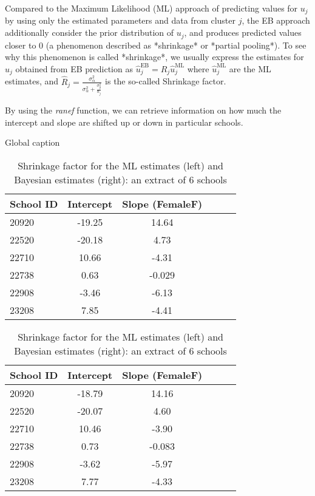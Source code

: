 Compared to the Maximum Likelihood (ML) approach of predicting values for $u_j$ by using only the estimated parameters and data from cluster $j$, the EB approach additionally consider the prior distribution of $u_{j}$, and produces predicted values closer to $0$ (a phenomenon described as *shrinkage* or *partial pooling*).  To see why this phenomenon is called *shrinkage*, we usually express the estimates for $u_j$ obtained from EB prediction as $\hat{u}_j^{\text{EB}} = \hat{R}_j\hat{u}_j^{\text{ML}}$ where $\hat{u}_j^{\text{ML}}$ are the ML estimates, and $\hat{R}_j = \frac{\sigma_\alpha^2}{\sigma_\alpha^2 + \frac{\sigma_y^2}{n_j}}$ is the so-called Shrinkage factor.

By using the \textit{ranef} function, we can retrieve information on how much the intercept and slope are shifted up or down in particular schools.

\begin{table}[!htb]
	\caption{Global caption}
	
	\begin{minipage}{.5\linewidth}
		\caption{}
		\centering
		{
			\begin{tabular}{l | c c c c c}
				School ID & Intercept & Slope (FemaleF)\\
				\hline
				20920 & -19.25 & 14.64 \\
				22520 & -20.18 & 4.73 \\
				22710 & 10.66 & -4.31 \\
				22738  & 0.63 & -0.029 \\
				22908 & -3.46 & -6.13 \\
				23208 & 7.85 & -4.41
			\end{tabular}
		}
	\end{minipage}%
	\begin{minipage}{.5\linewidth}
		\centering
		\caption{}
		{
			\begin{tabular}{l | c c c c c}
				School ID & Intercept & Slope (FemaleF)\\
				\hline
				20920 & -18.79 & 14.16 \\
				22520 & -20.07 & 4.60 \\
				22710  & 10.46 & -3.90 \\
				22738  & 0.73 & -0.083  \\
				22908 & -3.62 & -5.97 \\
				23208  & 7.77 & -4.33
			\end{tabular}
		}
		
	\end{minipage}
	\caption{{\small Shrinkage factor for the ML estimates (left) and Bayesian estimates (right): an extract of 6 schools}}
	\label{tab:shrinkage}
\end{table}

